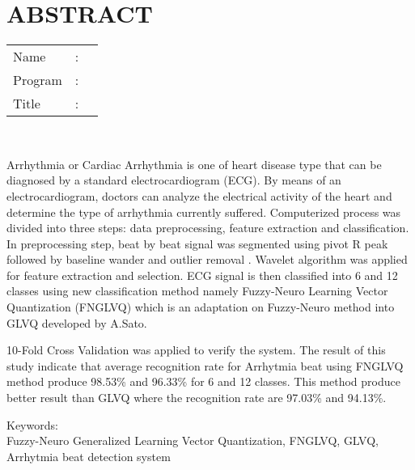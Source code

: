 %
%
%

\chapter*{ABSTRACT}

\vspace*{0.2cm}

\noindent \begin{tabular}{l l p{11.0cm}}
	Name&: & \penulis \\
	Program&: & \programstudi \\
	Title&: & \judulInggris \\
\end{tabular} \\ 

\vspace*{0.5cm}

\noindent
Arrhythmia or Cardiac Arrhythmia is one of heart
disease type that can be diagnosed by a standard electrocardiogram (ECG). By
means of an electrocardiogram, doctors can analyze the electrical activity of
the heart and determine the type of arrhythmia currently suffered. Computerized
process was divided into three steps: data preprocessing, feature extraction and
classification. In preprocessing step, beat by beat signal was segmented using
pivot R peak followed by baseline wander and outlier removal . Wavelet algorithm
was applied for feature extraction and selection. ECG signal is then classified
into 6 and 12 classes using new classification method namely Fuzzy-Neuro
Learning Vector Quantization (FNGLVQ) which is an adaptation on Fuzzy-Neuro
method into GLVQ developed by A.Sato.

10-Fold Cross Validation was applied to verify the system. The result of this
study indicate that average recognition rate for Arrhytmia beat using
FNGLVQ method produce 98.53\% and 96.33\% for 6 and 12 classes. This method
produce better result than GLVQ where the recognition rate are 97.03\% and
94.13\%.
\\


\vspace*{0.2cm}

\noindent Keywords: \\ 
\noindent Fuzzy-Neuro Generalized Learning Vector Quantization, FNGLVQ,
GLVQ, Arrhytmia beat detection system\\

\newpage
